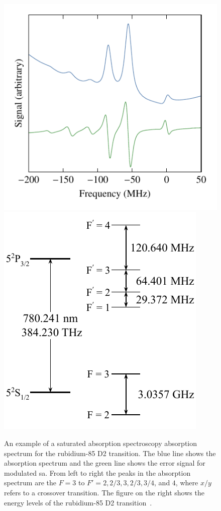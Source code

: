 \begin{figure}
    \center
    \includegraphics{part1/Figs/SatAbsSpectrum.pdf}
    \includegraphics{part1/Figs/Rb85_D2_Energy_Levels.pdf}
    \caption[Saturated absorption spectroscopy absorption spectrum.]{An example of a saturated absorption spectroscopy absorption spectrum for the rubidium-85 D2 transition.
    The blue line shows the absorption spectrum and the green line shows the error signal for modulated \gls{sa}.
    From left to right the peaks in the absorption spectrum are the $F=3$ to $F'=2,2/3,3,2/3,3/4$, and $4$, where $x/y$ refers to a crossover transition.
    The figure on the right shows the energy levels of the rubidium-85 D2 transition~\cite{steck_rubidium_2008}.}
    \label{figure:satabsspectrum}
\end{figure}

